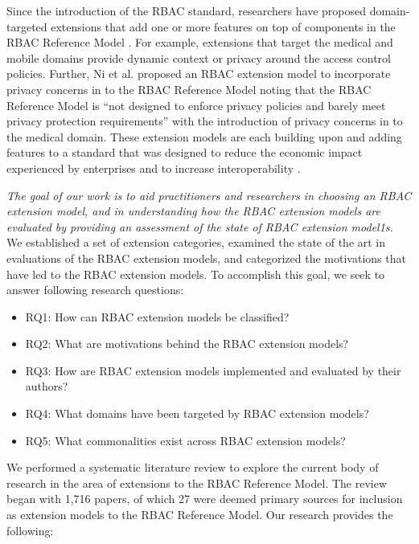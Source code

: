 Since the introduction of the RBAC standard, researchers have proposed domain-targeted extensions that add one or more features on top of components in the RBAC Reference Model \cite{kuhn2010adding}.
For example, extensions that target the medical and mobile domains provide dynamic context or privacy around the access control policies.
Further, Ni et al. \cite{ni2010privacy} proposed an RBAC extension model to incorporate privacy concerns in to the RBAC Reference Model noting that the RBAC Reference Model is ``not designed to enforce privacy policies and barely meet privacy protection requirements'' with the introduction of privacy concerns in to the medical domain.
These extension models are each building upon and adding features to a standard that was designed to reduce the economic impact experienced by enterprises and to increase interoperability \cite{o20102010}.

\textit{The goal of our work is to aid practitioners and researchers in choosing an RBAC extension model, and in understanding
how the RBAC extension models are evaluated by providing an assessment of the state of RBAC extension model1s.} We established a set of extension categories, examined the state of the art in evaluations of the RBAC extension models, and categorized the motivations that have led to the RBAC extension models.
To accomplish this goal, we seek to answer following research questions:

\begin{itemize}
\setlength{\itemsep}{0.25pt}
\item RQ1: How can RBAC extension models be classified?
\item RQ2: What are motivations behind the RBAC extension models?
\item RQ3: How are RBAC extension models implemented and evaluated by their authors?
\item RQ4: What domains have been targeted by RBAC extension models?
\item RQ5: What commonalities exist across RBAC extension models?
\end{itemize}

We performed a systematic literature review to explore the current body of research in the area of extensions to the RBAC Reference Model. 
The review began with 1,716 papers, of which 27 were deemed primary sources for inclusion as extension models to the RBAC Reference Model.
Our research provides the following:

